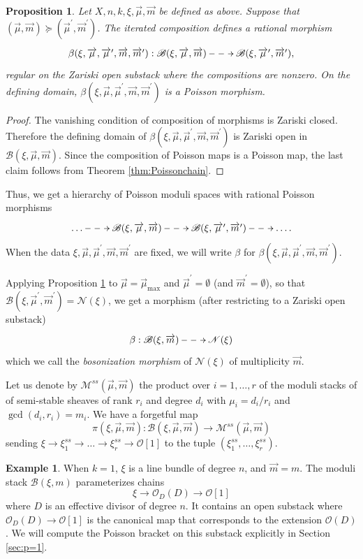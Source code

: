 \documentclass[reqno]{amsart}
\newtheorem{prop}[theorem]{Proposition}
\theoremstyle{definition}
\newtheorem{example}[theorem]{Example}
\theoremstyle{remark}
\newcommand{\cO}{\mathcal{O}}
\newcommand{\sB}{\mathscr{B}}
\newcommand{\sM}{\mathscr{M}}
\newcommand{\sN}{\mathscr{N}}
\newcommand{\am}{\overrightarrow{m}}
\newcommand{\amu}{\overrightarrow{\mu}}
\numberwithin{equation}{section}
\begin{document}
\begin{prop}\label{betapoisson}
Let $X,n,k,\xi,\amu,\am$ be defined as above. Suppose that $(\amu,\am)\succeq (\amu^\prime,\am^\prime)$. The iterated composition defines a rational morphism 
\[\xymatrix{
\beta(\xi, \amu,\amu^\prime, \am, \am^\prime): \sB(\xi, \amu,\am)\ar@{-->}[r]  &  \sB(\xi, \amu^\prime,\am^\prime),}
\]
regular on the Zariski open substack where the compositions are nonzero.
On the defining domain, $\beta(\xi, \amu,\amu^\prime, \am, \am^\prime)$ is a Poisson morphism.
\end{prop}
\begin{proof}
The vanishing condition of composition of morphisms is Zariski closed. Therefore the defining domain of  $\beta(\xi, \amu,\amu^\prime, \am, \am^\prime)$ is Zariski open in $ \sB(\xi, \amu,\am)$.
Since the composition of Poisson maps is a Poisson map, the last claim follows from Theorem \ref{thm:Poissonchain}.
\end{proof}

Thus, we get a hierarchy of Poisson moduli spaces with rational Poisson morphisms 
\[\xymatrix{
\ldots\ar@{-->}[r] & \sB(\xi, \amu,\am) \ar@{-->}[r] &  \sB(\xi, \amu^\prime,\am^\prime)\ar@{-->}[r] &\ldots.}
\]
When the data $\xi, \amu,\amu^\prime, \am, \am^\prime$ are fixed, we will write $\beta$ for $\beta(\xi, \amu,\amu^\prime, \am, \am^\prime)$. 

Applying Proposition \ref{betapoisson} to $\amu=\amu_{\max}$ and $\amu^\prime=\emptyset$ (and $\am^\prime=\emptyset$), so that
$\sB(\xi, \amu^\prime,\am^\prime)=\sN(\xi)$,
we get a morphism (after restricting to a Zariski open substack)
\[\xymatrix{
\beta:\sB(\xi,\am)\ar@{-->}[r] & \sN(\xi)}
\]
which we call the \emph{bosonization morphism} of $\sN(\xi)$ of multiplicity $\am$.

Let us denote by $\sM^{ss}(\amu,\am)$ the product over $i=1,\ldots,r$ of the moduli stacks of 
of semi-stable sheaves of rank $r_i$ and degree $d_i$ with $\mu_i=d_i/r_i$ and $\gcd(d_i,r_i)=m_i$. We have a forgetful map
\[
\pi(\xi, \amu,\am):  \sB(\xi, \amu,\am)\to\sM^{ss}(\amu,\am)
\] sending
$\xi\to \xi^{ss}_1\to \ldots \to \xi^{ss}_r\to\cO[1]$
to the tuple 
$(\xi^{ss}_1,\ldots, \xi^{ss}_{r})$.  

\begin{example}
When $k=1$,  $\xi$ is a line bundle of degree $n$, and $\am=m$. The moduli stack $\sB(\xi,m)$ parameterizes chains
\[
\xi\to \cO_D(D)\to \cO[1]
\] where $D$ is an effective divisor of degree $n$. It contains an open substack where $\cO_D(D)\to \cO[1]$ is the canonical map that corresponds to the extension $\cO(D)$.  We will compute the Poisson bracket on this substack explicitly in Section \ref{sec:p=1}.
\end{example}
 
\end{document}
